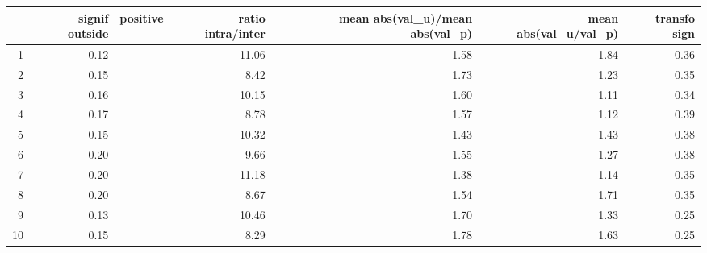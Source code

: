 \begin{table}[ht]
\centering
\begin{tabular}{rrrrrrr}
  \hline
 & signif outside & positive & ratio intra/inter & mean abs(val\_u)/mean abs(val\_p) & mean abs(val\_u/val\_p) & transfo sign \\ 
  \hline
1 & 0.12 &  & 11.06 & 1.58 & 1.84 & 0.36 \\ 
  2 & 0.15 &  & 8.42 & 1.73 & 1.23 & 0.35 \\ 
  3 & 0.16 &  & 10.15 & 1.60 & 1.11 & 0.34 \\ 
  4 & 0.17 &  & 8.78 & 1.57 & 1.12 & 0.39 \\ 
  5 & 0.15 &  & 10.32 & 1.43 & 1.43 & 0.38 \\ 
  6 & 0.20 &  & 9.66 & 1.55 & 1.27 & 0.38 \\ 
  7 & 0.20 &  & 11.18 & 1.38 & 1.14 & 0.35 \\ 
  8 & 0.20 &  & 8.67 & 1.54 & 1.71 & 0.35 \\ 
  9 & 0.13 &  & 10.46 & 1.70 & 1.33 & 0.25 \\ 
  10 & 0.15 &  & 8.29 & 1.78 & 1.63 & 0.25 \\ 
   \hline
\end{tabular}
\end{table}
